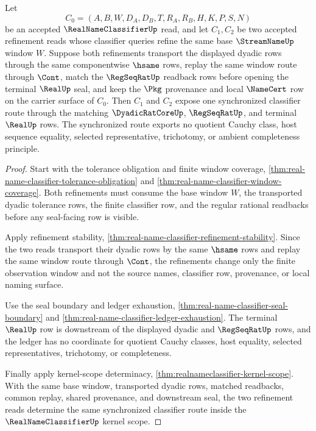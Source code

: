 \begin{theorem}
\label{thm:real-name-classifier-refined-window-synchronization}
Let
$$
C_0=(A,B,W,D_A,D_B,T,R_A,R_B,H,K,P,S,N)
$$
be an accepted $\RealNameClassifierUp$ read, and let $C_1,C_2$ be two accepted refinement reads whose classifier queries refine the same base $\StreamNameUp$ window $W$. Suppose both refinements transport the displayed dyadic rows through the same componentwise $\hsame$ rows, replay the same window route through $\Cont$, match the $\RegSeqRatUp$ readback rows before opening the terminal $\RealUp$ seal, and keep the $\Pkg$ provenance and local $\NameCert$ row on the carrier surface of $C_0$. Then $C_1$ and $C_2$ expose one synchronized classifier route through the matching $\DyadicRatCoreUp$, $\RegSeqRatUp$, and terminal $\RealUp$ rows. The synchronized route exports no quotient Cauchy class, host sequence equality, selected representative, trichotomy, or ambient completeness principle.
\end{theorem}
\begin{proof}
Start with the tolerance obligation and finite window coverage, \autoref{thm:real-name-classifier-tolerance-obligation} and \autoref{thm:real-name-classifier-window-coverage}. Both refinements must consume the base window $W$, the transported dyadic tolerance rows, the finite classifier row, and the regular rational readbacks before any seal-facing row is visible.

Apply refinement stability, \autoref{thm:real-name-classifier-refinement-stability}. Since the two reads transport their dyadic rows by the same $\hsame$ rows and replay the same window route through $\Cont$, the refinements change only the finite observation window and not the source names, classifier row, provenance, or local naming surface.

Use the seal boundary and ledger exhaustion, \autoref{thm:real-name-classifier-seal-boundary} and \autoref{thm:real-name-classifier-ledger-exhaustion}. The terminal $\RealUp$ row is downstream of the displayed dyadic and $\RegSeqRatUp$ rows, and the ledger has no coordinate for quotient Cauchy classes, host equality, selected representatives, trichotomy, or completeness.

Finally apply kernel-scope determinacy, \autoref{thm:realnameclassifier-kernel-scope}. With the same base window, transported dyadic rows, matched readbacks, common replay, shared provenance, and downstream seal, the two refinement reads determine the same synchronized classifier route inside the $\RealNameClassifierUp$ kernel scope.
\end{proof}

